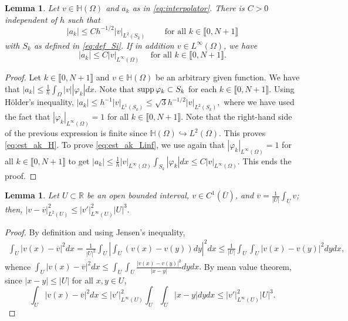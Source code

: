 \documentclass[11 pt]{article}
\newcommand\inter[1]{\llbracket #1\rrbracket}
\newtheorem{lemma}[theorem]{Lemma}
\numberwithin{equation}{section}
\def\R{\mathbb{R}}
\begin{document}
%
\begin{lemma}\label{lem:bounds_aks}
Let $v\in \mathbb H(\Omega)$ and $a_k$ as in \eqref{eq:interpolator}. There is $C>0$ independent of $h$ such that
%
\begin{equation}\label{eq:est_ak_H}
    |a_k|\leq C h^{-1/2} |v|_{L^2(S_k)}\qquad \text{ for all } k\in\inter{0,N+1}
\end{equation}
%
with $S_k$ as defined in \eqref{eq:def_Si}. If in addition $v\in L^\infty(\Omega)$, we have
\begin{equation}\label{eq:est_ak_Linf}
    |a_k|\leq C |v|_{L^\infty(\Omega)} \quad\text{ for all } k\in\inter{0,N+1}.
\end{equation}
\end{lemma}
%
\begin{proof}
Let $k\in\inter{0,N+1}$ and $v\in\mathbb H(\Omega)$ be an arbitrary given function. We have that $|a_k|\leq \frac{1}{h}\int_{\Omega}|v||\varphi_k|dx.$ Note that $\textnormal{supp}\,\varphi_k\subset S_k$ for each $k\in\inter{0,N+1}$. Using H\"older's inequality, $|a_k|\leq h^{-1}|v|_{L^1(S_k)}\leq \sqrt{3}h^{-1/2}|v|_{L^2(S_k)},$ where we have used the fact that $|\varphi_k|_{L^\infty(\Omega)}=1$ for all $k\in\inter{0,N+1}$. Note that the right-hand side of the previous expression is finite since $\mathbb H(\Omega)\hookrightarrow L^2(\Omega)$. This proves \eqref{eq:est_ak_H}. To prove \eqref{eq:est_ak_Linf}, we use again that $|\varphi_k|_{L^\infty(\Omega)}=1$ for all $k\in\inter{0,N+1}$ to get $|a_k|\leq \frac{1}{h}|v|_{L^\infty(\Omega)}\int_{S_k}|\varphi_k| dx \leq C|v|_{L^\infty(\Omega)}.$ This ends the proof.
\end{proof}

\begin{lemma}\label{lem:poincare_type}
Let $U\subset \R$ be an open bounded interval, $v\in C^1(\overline{U})$, and $\overline v=\frac{1}{|U|}\int_{U}v$; then, $
    |v-\overline{v}|_{L^2(U)}^2\leq |v'|^2_{L^\infty(U)}|U|^3.$
%
\end{lemma}
%
\begin{proof}
By definition and using Jensen's inequality,
%
\begin{align*}
    \int_{U}|v(x)-\overline{v}|^2dx=\frac{1}{|U|^2}\int_{U}\left|\int_{U}(v(x)-v(y))dy\right|^2dx \leq \frac{1}{|U|}\int_{U}\int_{U}|v(x)-v(y)|^2dy dx,
\end{align*}
%
whence $\int_{U}|v(x)-\overline{v}|^2dx \leq \int_{U}\int_{U}\frac{|v(x)-v(y)|^2}{|x-y|}dy dx.$ By mean value theorem, since $|x-y|\leq |U|$ for all $x,y\in U$,
%
\begin{equation*}
    \int_{U}|v(x)-\overline{v}|^2dx 
    \leq |v'|^2_{L^\infty(U)}\int_{U}\int_{U}|x-y|dy dx
    \leq |v'|^2_{L^\infty(U)}|U|^3.
\end{equation*}
\end{proof}
\end{document}

